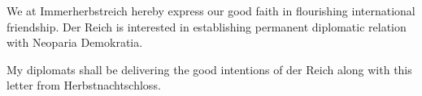 



We at Immerherbstreich hereby express our good faith in flourishing international friendship.
Der Reich is interested in establishing permanent diplomatic relation with Neoparia Demokratia.

My diplomats shall be delivering the good intentions of der Reich along with this letter from Herbstnachtschloss.


